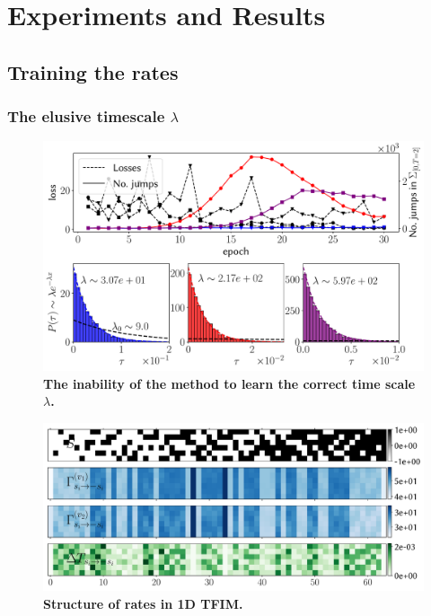 \ifpdf
\graphicspath{{Chapter5/Figs/Raster/}{Chapter5/Figs/PDF/}{Chapter5/Figs/}}
\else
\graphicspath{{Chapter5/Figs/Vector/}{Chapter5/Figs/}}
\fi


\chapter{Experiments and Results}
\label{chapter5}

\section{Training the rates}
\subsection{The elusive timescale $\lambda$}
\begin{figure}[H]
	\centering
	\includegraphics[width=\linewidth]{Chapter5/Figs/Vector/scale_blowup}
	\caption[The inability of the method to learn the correct time scale $\lambda$]{\textbf{The inability of the method to learn the correct time scale $\lambda$.}}
	\label{fig:scaleblowup}
\end{figure}

\begin{figure}[H]
	\centering
	\includegraphics[width=\linewidth]{Chapter5/Figs/Vector/rate_structure.pdf}
	\caption[Structure of learned rates for 1D TFIM]{\textbf{Structure of rates in 1D TFIM.}}
	\label{fig:}
\end{figure}

